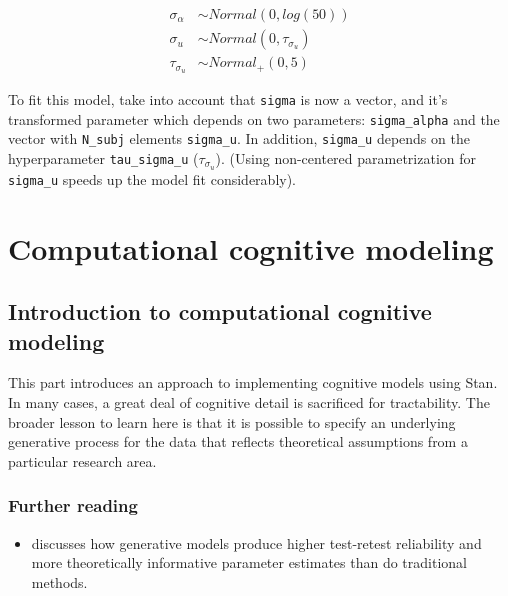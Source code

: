 \documentclass[12pt,]{krantz}
\providecommand{\tightlist}{%
  \setlength{\itemsep}{0pt}\setlength{\parskip}{0pt}}
\theoremstyle{definition}
\theoremstyle{definition}
\theoremstyle{definition}
\theoremstyle{remark}
\begin{document}
\begin{equation}
\begin{aligned}
  \sigma_\alpha &\sim Normal(0,log(50))\\
  \sigma_u &\sim Normal(0, \tau_{\sigma_u}) \\
  \tau_{\sigma_u} &\sim Normal_+(0, 5)
\end{aligned}
\end{equation}

To fit this model, take into account that \texttt{sigma} is now a vector, and it's transformed parameter which depends on two parameters: \texttt{sigma\_alpha} and the vector with \texttt{N\_subj} elements \texttt{sigma\_u}. In addition, \texttt{sigma\_u} depends on the hyperparameter \texttt{tau\_sigma\_u} (\(\tau_{\sigma_u}\)). (Using non-centered parametrization for \texttt{sigma\_u} speeds up the model fit considerably).

\hypertarget{part-computational-cognitive-modeling}{%
\part{Computational cognitive modeling}\label{part-computational-cognitive-modeling}}

\hypertarget{introduction-to-computational-cognitive-modeling}{%
\chapter{Introduction to computational cognitive modeling}\label{introduction-to-computational-cognitive-modeling}}

This part introduces an approach to implementing cognitive models using Stan. In many cases, a great deal of cognitive detail is sacrificed for tractability. The broader lesson to learn here is that it is possible to specify an underlying generative process for the data that reflects theoretical assumptions from a particular research area.

\hypertarget{further-reading-10}{%
\section{Further reading}\label{further-reading-10}}

\begin{itemize}
\tightlist
\item
  \citet{haines2020learning} discusses how generative models produce higher test-retest reliability and more theoretically informative parameter estimates than do traditional methods.
\end{itemize}
\end{document}
